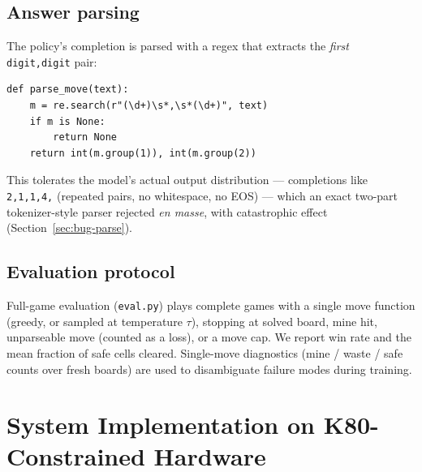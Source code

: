 \documentclass[11pt]{article}
\begin{document}
\subsection{Answer parsing}
The policy's completion is parsed with a regex that extracts the \emph{first}
\texttt{digit,digit} pair:
\begin{lstlisting}[caption={\texttt{parse\_move}: the parser is part of the reward.}]
def parse_move(text):
    m = re.search(r"(\d+)\s*,\s*(\d+)", text)
    if m is None:
        return None
    return int(m.group(1)), int(m.group(2))
\end{lstlisting}
This tolerates the model's actual output distribution --- completions like
\texttt{2,1,1,4,} (repeated pairs, no whitespace, no EOS) --- which an exact
two-part tokenizer-style parser rejected \emph{en masse}, with catastrophic
effect (Section~\ref{sec:bug-parse}).

\subsection{Evaluation protocol}
Full-game evaluation (\texttt{eval.py}) plays complete games with a single
move function (greedy, or sampled at temperature $\tau$), stopping at solved
board, mine hit, unparseable move (counted as a loss), or a move cap. We
report win rate and the mean fraction of safe cells cleared. Single-move
diagnostics (mine / waste / safe counts over fresh boards) are used to
disambiguate failure modes during training.

\section{System Implementation on K80-Constrained Hardware}
\label{sec:system}
\end{document}
